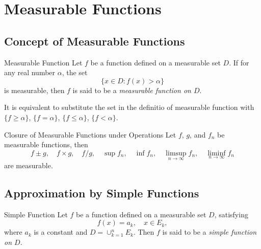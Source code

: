 

\section{Measurable Functions}

\subsection{Concept of Measurable Functions}

\begin{definition}{Measurable Function}{}
  Let $f$ be a function defined on a measurable set $D$.
  If for any real number $\alpha$, the set
  \begin{equation}
    \{x \in D: f(x) > \alpha\}
  \end{equation}
  is measurable, then $f$ is said to be a \emph{measurable function on $D$}.
\end{definition}

\begin{note}
  It is equivalent to substitute the set in the definitio of measurable function with
  $\{f \geq \alpha\}$, $\{f = \alpha\}$, $\{f \leq \alpha\}$, $\{f < \alpha\}$.
\end{note}

\begin{proposition}{Closure of Measurable Functions under Operations}{}
  Let $f$, $g$, and $f_n$ be measurable functions, then
  \begin{equation}
    f \pm g, \quad f \times g, \quad f / g, \quad \sup f_n, \quad \inf f_n, \quad
    \limsup \limits_{n \rightarrow \infty}f_n, \quad
    \liminf \limits_{n \rightarrow \infty}f_n
  \end{equation}
  are measurable.
\end{proposition}

\subsection{Approximation by Simple Functions}

\begin{definition}{Simple Function}{}
  Let $f$ be a function defined on a measurable set $D$, satisfying
  \begin{equation}
    f(x) = a_k, \quad x \in E_k,
  \end{equation}
  where $a_k$ is a constant and $D = \cup _{k = 1}^n E_k$.
  Then $f$ is said to be a \emph{simple function on $D$}.
\end{definition}

